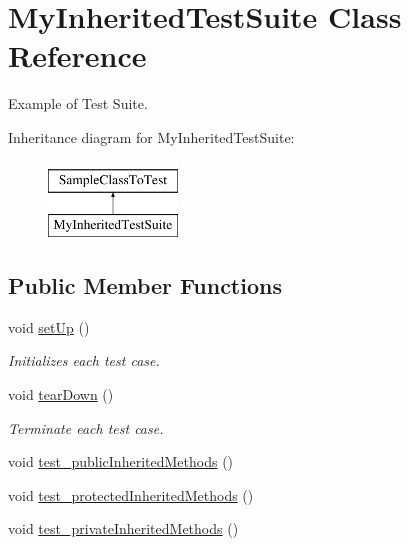 \hypertarget{class_my_inherited_test_suite}{}\section{My\+Inherited\+Test\+Suite Class Reference}
\label{class_my_inherited_test_suite}


Example of Test Suite.  


Inheritance diagram for My\+Inherited\+Test\+Suite\+:\begin{figure}[H]
\begin{center}
\leavevmode
\includegraphics[height=2.000000cm]{class_my_inherited_test_suite}
\end{center}
\end{figure}
\subsection*{Public Member Functions}
\begin{DoxyCompactItemize}
\item 
void \mbox{\hyperlink{class_my_inherited_test_suite_a3aa9d1d4ab762d55cfee1d2f6298c3f9}{set\+Up}} ()
\begin{DoxyCompactList}\small\item\em Initializes each test case. \end{DoxyCompactList}\item 
void \mbox{\hyperlink{class_my_inherited_test_suite_abbd94d1b4868f8252b001ce743eeb691}{tear\+Down}} ()
\begin{DoxyCompactList}\small\item\em Terminate each test case. \end{DoxyCompactList}\item 
void \mbox{\hyperlink{class_my_inherited_test_suite_a1a6a926a8fb9d03618008b6d882a1cfe}{test\+\_\+public\+Inherited\+Methods}} ()
\item 
void \mbox{\hyperlink{class_my_inherited_test_suite_a7fef4b3ee5331b5454ce3b6b66813e6d}{test\+\_\+protected\+Inherited\+Methods}} ()
\item 
void \mbox{\hyperlink{class_my_inherited_test_suite_a17797338b2152e4c8d5354f2efd30692}{test\+\_\+private\+Inherited\+Methods}} ()
\end{DoxyCompactItemize}
